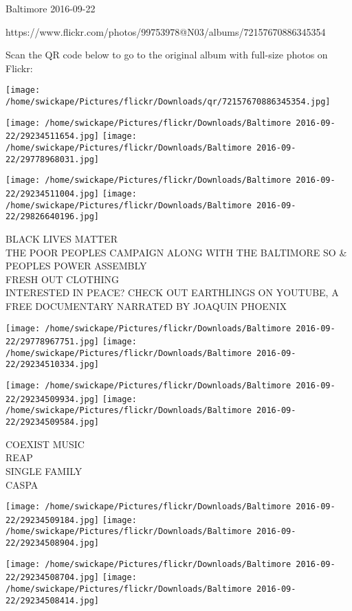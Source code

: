 \documentclass[10pt,letterpaper]{article}
\begin{document}
Baltimore 2016-09-22

https://www.flickr.com/photos/99753978@N03/albums/72157670886345354

Scan the QR code below to go to the original album with full-size photos on Flickr:

\texttt{[image: /home/swickape/Pictures/flickr/Downloads/qr/72157670886345354.jpg]}
\pagebreak

\texttt{[image: /home/swickape/Pictures/flickr/Downloads/Baltimore 2016-09-22/29234511654.jpg]}
\texttt{[image: /home/swickape/Pictures/flickr/Downloads/Baltimore 2016-09-22/29778968031.jpg]}

\texttt{[image: /home/swickape/Pictures/flickr/Downloads/Baltimore 2016-09-22/29234511004.jpg]}
\texttt{[image: /home/swickape/Pictures/flickr/Downloads/Baltimore 2016-09-22/29826640196.jpg]}

BLACK LIVES MATTER\\
THE POOR PEOPLES CAMPAIGN ALONG WITH THE BALTIMORE SO \& PEOPLES POWER ASSEMBLY\\
FRESH OUT CLOTHING\\
INTERESTED IN PEACE?  CHECK OUT EARTHLINGS ON YOUTUBE, A FREE DOCUMENTARY NARRATED BY JOAQUIN PHOENIX
\pagebreak

\texttt{[image: /home/swickape/Pictures/flickr/Downloads/Baltimore 2016-09-22/29778967751.jpg]}
\texttt{[image: /home/swickape/Pictures/flickr/Downloads/Baltimore 2016-09-22/29234510334.jpg]}

\texttt{[image: /home/swickape/Pictures/flickr/Downloads/Baltimore 2016-09-22/29234509934.jpg]}
\texttt{[image: /home/swickape/Pictures/flickr/Downloads/Baltimore 2016-09-22/29234509584.jpg]}

COEXIST MUSIC\\
REAP\\
SINGLE FAMILY\\
CASPA
\pagebreak

\texttt{[image: /home/swickape/Pictures/flickr/Downloads/Baltimore 2016-09-22/29234509184.jpg]}
\texttt{[image: /home/swickape/Pictures/flickr/Downloads/Baltimore 2016-09-22/29234508904.jpg]}

\texttt{[image: /home/swickape/Pictures/flickr/Downloads/Baltimore 2016-09-22/29234508704.jpg]}
\texttt{[image: /home/swickape/Pictures/flickr/Downloads/Baltimore 2016-09-22/29234508414.jpg]}
\end{document}
